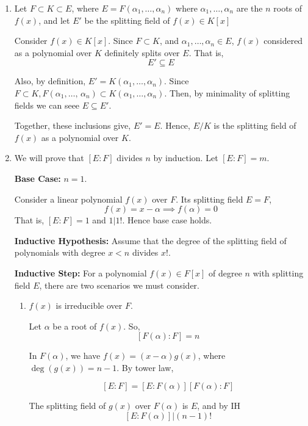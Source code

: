 \documentclass[12pt]{article}
\begin{document}
\begin{solution}
    \bbni 
    \begin{enumerate}
        \item Let $F \subset K \subset E$, where $E = F(\alpha_1, \ldots, \alpha_n)$ where $\alpha_1, \ldots, \alpha_n$ are the $n$ roots of $f(x)$, and let $E'$ be the splitting field of $f(x) \in K[x]$
        
        Consider $f(x) \in K[x]$. Since $F \subset K$, and  $\alpha_1, \ldots, \alpha_n \in E$, $f(x)$ considered as a polynomial over $K$ definitely splits over $E$. That is, 
        \[E' \subseteq E\]
        
        Also, by definition, $E' = K(\alpha_1, \ldots, \alpha_n)$. Since $F \subset K, F(\alpha_1, \ldots, \, \alpha_n) \subset K(\alpha_1, \ldots, \alpha_n)$. Then, by minimality of splitting fields we can seee $E \subseteq E'$.
        
        Together, these inclusions give, $E'=E$. Hence, $E/K$ is the splitting field of $f(x)$ as a polynomial over $K$. 


        
        \item We will prove that $[E:F]$ divides $n$ by induction. Let $[E:F] = m$. 
        
        \textbf{Base Case:} $n=1$. 

        Consider a linear polynomial $f(x)$ over $F$. Its splitting field $E = F$, 
        \[f(x) = x - \alpha  \implies f(\alpha) = 0\]
        That is, $[E:F] = 1$ and $1 | 1!$. Hence base case holds. 


        \textbf{Inductive Hypothesis:} Assume that the degree of the splitting field of polynomials with degree $x < n$ divides $x!$. 

        \textbf{Inductive Step:} For a polynomial $f(x) \in F[x]$ of degree $n$ with splitting field $E$, there are two scenarios we must consider. 
        \begin{enumerate}
            \item $f(x)$ is irreducible over $F$. 
            
            Let $\alpha$ be a root of $f(x)$. So, 
            \[[F(\alpha) : F ]= n\]

            In $F(\alpha)$, we have $f(x) = (x - \alpha )g(x)$, where $\deg(g(x)) = n -1$. By tower law, 

            \[[E:F] = [E:F(\alpha)][F(\alpha): F]\]

            The splitting field of $g(x)$ over $F(\alpha)$ is $E$, and by IH 
            \[[E:F(\alpha)] \big | (n-1)!\]


\end{enumerate}
\end{enumerate}
\end{solution}
\end{document}
